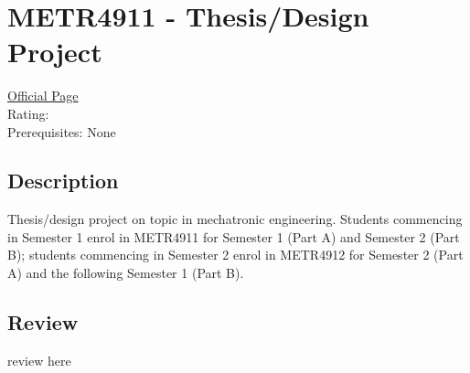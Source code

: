 \hypertarget{METR4911}{\section{METR4911 - Thesis/Design Project}}

\large
\textcolor{turbo_purple}{\href{https://my.uq.edu.au/programs-courses/course.html?course_code=METR4911}{Official Page}} \\
Rating: \cstar\cstar\cstar\cstar\ostar \\
Prerequisites: None

\normalsize
\subsection*{Description}
Thesis/design project on topic in mechatronic engineering.
Students commencing in Semester 1 enrol in METR4911 for Semester 1 (Part A) and Semester 2 (Part B); students commencing in Semester 2 enrol in METR4912 for Semester 2 (Part A) and the following Semester 1 (Part B).

\subsection*{Review}
review here
